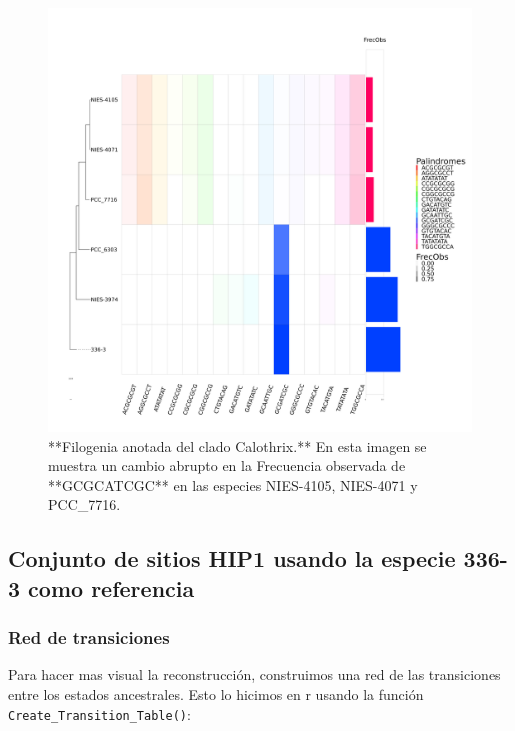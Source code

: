 \documentclass[
]{book}
\begin{document}
\begin{figure}

{\centering \includegraphics[width=1\linewidth]{Clados/Callothrix_clade/figures/Calothrix_Octanuc_FrecObs_sel32_filogenia_HIG} 

}

\caption{**Filogenia anotada del clado Calothrix.** En esta imagen se muestra un cambio abrupto en la Frecuencia observada de **GCGCATCGC** en las especies NIES-4105, NIES-4071 y PCC\_7716.}\label{fig:FIG12}
\end{figure}

\hypertarget{conjunto-de-sitios-hip1-usando-la-especie-336-3-como-referencia}{%
\subsection{Conjunto de sitios HIP1 usando la especie 336-3 como referencia}\label{conjunto-de-sitios-hip1-usando-la-especie-336-3-como-referencia}}

\hypertarget{red-de-transiciones}{%
\subsubsection{Red de transiciones}\label{red-de-transiciones}}

Para hacer mas visual la reconstrucción, construimos una red de las transiciones entre los estados ancestrales. Esto lo hicimos en r usando la función \texttt{Create\_Transition\_Table()}:
\end{document}
